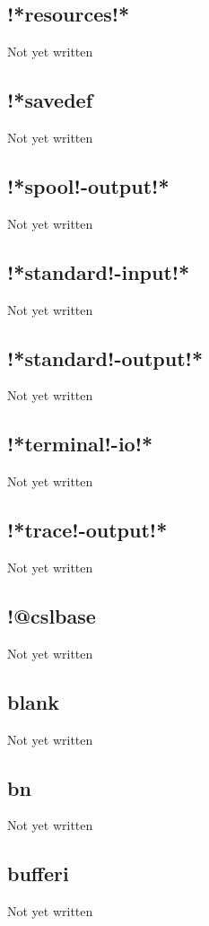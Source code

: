 \documentclass[a4paper,11pt]{article}
\begin{document}
\subsection{\ttfamily !*resources!*}
Not yet written

\subsection{\ttfamily !*savedef}
Not yet written

\subsection{\ttfamily !*spool!-output!*}
Not yet written

\subsection{\ttfamily !*standard!-input!*}
Not yet written

\subsection{\ttfamily !*standard!-output!*}
Not yet written

\subsection{\ttfamily !*terminal!-io!*}
Not yet written

\subsection{\ttfamily !*trace!-output!*}
Not yet written

\subsection{\ttfamily !@cslbase}
Not yet written

\subsection{\ttfamily blank}
Not yet written

\subsection{\ttfamily bn}
Not yet written

\subsection{\ttfamily bufferi}
Not yet written
\end{document}
